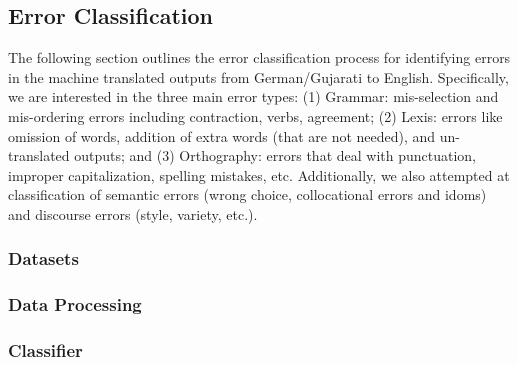\subsection{Error Classification}
\label{sec:method-error}
The following section outlines the error classification process for identifying errors 
in the machine translated outputs from German/Gujarati to English. Specifically, we are 
interested in the three main error types: 
    (1) Grammar: mis-selection and mis-ordering errors including contraction, verbs, 
                agreement; 
    (2) Lexis: errors like omission of words, addition of extra words (that are not needed), 
                and un-translated outputs; and 
    (3) Orthography: errors that deal with punctuation, improper capitalization, spelling 
                mistakes, etc. 
Additionally, we also attempted at classification of semantic errors (wrong choice, collocational errors and idoms)
and discourse errors (style, variety, etc.). 

    \subsubsection{Datasets}
    
    \label{sec:method-error-datasets}

    \subsubsection{Data Processing}
    
    \label{sec:method-error-dataprocessing}

    \subsubsection{Classifier}
    
    \label{sec:method-error-errorclassifier}